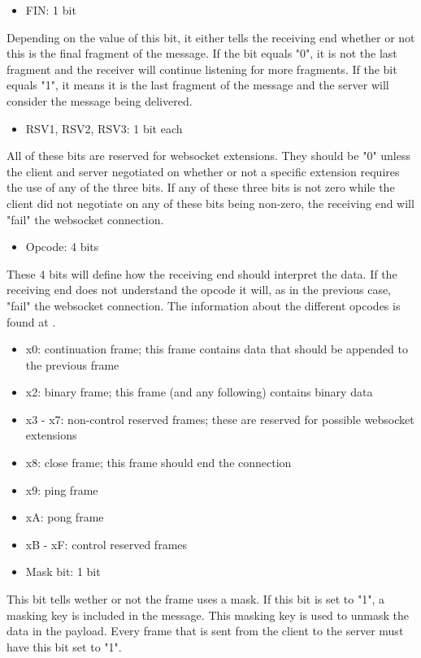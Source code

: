 \documentclass[a4paper, 11pt]{report}
\begin{document}
	\begin{itemize}
		\item {FIN: 1 bit}
	\end{itemize}
Depending on the value of this bit, it either tells the receiving end whether or not this is the final fragment of the message. If the bit equals "0", it is not the last fragment and the receiver will continue listening for more fragments. If the bit equals "1", it means it is the last fragment of the message and the server will consider the message being delivered.
	\begin{itemize}
		\item {RSV1, RSV2, RSV3:  1 bit each}
	\end{itemize}
All of these bits are reserved for websocket extensions. They should be "0" unless the client and server negotiated on whether or not a specific extension requires the use of any of the three bits. If any of these three bits is not zero while the client did not negotiate on any of these bits being non-zero, the receiving end will "fail" the websocket connection.
	\begin{itemize}
		\item {Opcode:  4 bits}
	\end{itemize}
These 4 bits will define how the receiving end should interpret the data. If the receiving end does not understand the opcode it will, as in the previous case, "fail" the websocket connection. The information about the different opcodes is found at \cite{opcode}.
	\begin{itemize}
		\item[] {x0: continuation frame; this frame contains data that should be appended to the previous frame}
		\item[] {x2: binary frame; this frame (and any following) contains binary data}
		\item[] {x3 - x7: non-control reserved frames; these are reserved for possible websocket extensions}
		\item[] {x8: close frame; this frame should end the connection}
		\item[] {x9: ping frame}
		\item[] {xA: pong frame}
		\item[] {xB - xF: control reserved frames}
	\end{itemize}
	\begin{itemize}
		\item {Mask bit: 1 bit}
	\end{itemize}
This bit tells wether or not the frame uses a mask. If this bit is set to "1", a masking key is included in the message.  This masking key is used to unmask the data in the payload. Every frame that is sent from the client to the server must have this bit set to "1".
\end{document}
